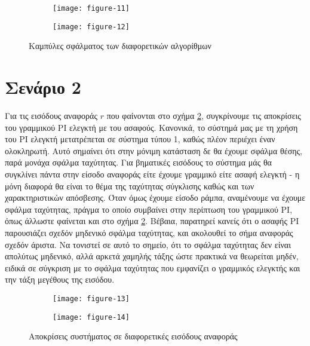 \documentclass[11pt,a4paper,titlepage, oneside]{article}
\newlength\figureheight
\begin{document}
	\begin{figure}[h]
	 	\setlength\figureheight{5.3cm}
		\centering
		\begin{subfigure}[b]{0.49\textwidth}
			\texttt{[image: figure-11]}
		\end{subfigure}
		\begin{subfigure}[b]{0.49\textwidth}
			\texttt{[image: figure-12]}
		\end{subfigure}
		\caption{Καμπύλες σφάλματος των διαφορετικών αλγορίθμων}
		\label{fig:surf_plots}
	\end{figure}

	\section{Σενάριο 2}
	Για τις εισόδους αναφοράς $r$ που φαίνονται στο σχήμα \ref{fig:response_plots_2}, συγκρίνουμε τις αποκρίσεις του γραμμικού PI ελεγκτή με του ασαφούς. Κανονικά, το σύστημά μας με τη χρήση του PI ελεγκτή μετατρέπεται σε σύστημα τύπου 1, καθώς πλέον περιέχει έναν ολοκληρωτή. Αυτό σημαίνει ότι στην μόνιμη κατάσταση δε θα έχουμε σφάλμα θέσης, παρά μονάχα σφάλμα ταχύτητας. Για βηματικές εισόδους το σύστημα μάς θα συγκλίνει πάντα στην είσοδο αναφοράς είτε έχουμε γραμμικό είτε ασαφή ελεγκτή - η μόνη διαφορά θα είναι το θέμα της ταχύτητας σύγκλισης καθώς και των χαρακτηριστικών απόσβεσης. Όταν όμως έχουμε είσοδο ράμπα, αναμένουμε να έχουμε σφάλμα ταχύτητας, πράγμα το οποίο συμβαίνει στην περίπτωση του γραμμικού PI, όπως άλλωστε φαίνεται και στο σχήμα \ref{fig:response_plots_2}. Βέβαια, παρατηρεί κανείς ότι ο ασαφής PI παρουσιάζει σχεδόν μηδενικό σφάλμα ταχύτητας, και ακολουθεί το σήμα αναφοράς σχεδόν άριστα. Να τονιστεί σε αυτό το σημείο, ότι το σφάλμα ταχύτητας δεν είναι απολύτως μηδενικό, αλλά αρκετά χαμηλής τάξης ώστε πρακτικά να θεωρείται μηδέν, ειδικά σε σύγκριση με το σφάλμα ταχύτητας που εμφανίζει ο γραμμικός ελεγκτής και την τάξη μεγέθους της εισόδου.

	\begin{figure}[]
		\setlength\figureheight{2.67cm}
		\centering
		\begin{subfigure}[b]{0.49\textwidth}
			\texttt{[image: figure-13]}
		\end{subfigure}
		\begin{subfigure}[b]{0.49\textwidth}
			\texttt{[image: figure-14]}
		\end{subfigure}
		\caption{Αποκρίσεις συστήματος σε διαφορετικές εισόδους αναφοράς}
		\label{fig:response_plots_2}
	\end{figure}
\end{document}
